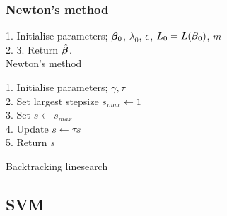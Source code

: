 \begin{appendices}
\subsubsection{Newton's method}

\begin{algorithm}[H]
    1. Initialise parameters; $\bm{\beta}_0$, $\lambda_0$, $\epsilon$, $L_0 = L(\bm{\beta}_0)$, $m$\\
    2.  
    3. Return $\hat{\bm{\beta}}$.\\
    \caption{Newton's method}
\end{algorithm}
\label{algo:newton}

\begin{algorithm}[H]
    1. Initialise parameters; $\gamma, \tau$ \\
    2. Set largest stepsize $s_{max}\leftarrow 1$ \\
    3. Set $s \leftarrow s_{max}$ \\
    4.  {
        Update $s\leftarrow \tau s$ \\
    }
    5. Return $s$
    \caption{Backtracking linesearch}
\end{algorithm}
\label{algo:line}

\subsection{SVM}
\label{app:svm}

\end{appendices}
